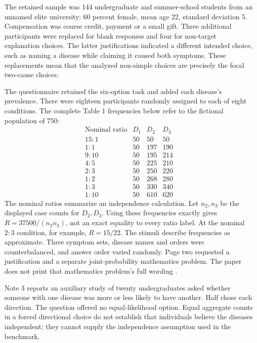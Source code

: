 The retained sample was 144 undergraduate and summer-school
students from an unnamed elite university: 60 percent female,
mean age 22, standard deviation 5. Compensation was course credit,
payment or a small gift. Three additional participants were
replaced for blank responses and four for non-target explanation
choices. The latter justifications indicated a different intended
choice, such as naming a disease while claiming it caused both
symptoms. These replacements mean that the analyzed non-simple
choices are precisely the focal two-cause choices.

The questionnaire retained the six-option task and added each
disease's prevalence. There were eighteen participants randomly
assigned to each of eight conditions. The complete Table 1
frequencies below refer to the fictional population of 750:
\[
\begin{array}{c|rrr}
 \text{Nominal ratio}&D_1&D_2&D_3\\\hline
 15:1&50&50&50\\
 1:1&50&197&190\\
 9:10&50&195&214\\
 4:5&50&225&210\\
 2:3&50&250&220\\
 1:2&50&268&280\\
 1:3&50&330&340\\
 1:10&50&610&620
\end{array}
\]
The nominal ratios summarize an independence calculation.
Let \(n_2,n_3\) be the displayed case counts for \(D_2,D_3\).
Using these frequencies exactly gives
\(R=37500/(n_2n_3)\), not an exact equality to every ratio
label. At the nominal \(2:3\) condition, for example,
\(R=15/22\). The stimuli describe frequencies as approximate.
Three symptom sets, disease names and orders were counterbalanced,
and answer order varied randomly. Page two requested a
justification and a separate joint-probability mathematics problem.
The paper does not print that mathematics problem's full wording
\cite[pp.~239--240, table~1]{Lombrozo2007SimplicityProbability}.

Note 3 reports an auxiliary study of twenty undergraduates asked
whether someone with one disease was more or less likely to have
another. Half chose each direction. The question offered no
equal-likelihood option. Equal aggregate counts in a forced
directional choice do not establish that individuals believe
the diseases independent; they cannot supply the independence
assumption used in the benchmark.

